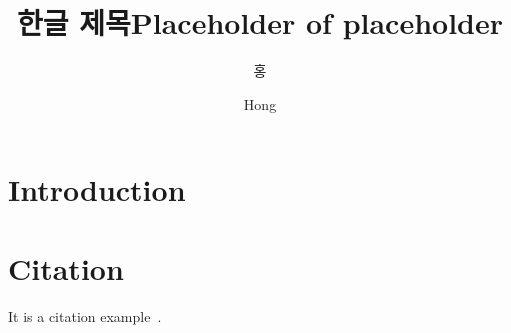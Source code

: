 \documentclass[doctor,english,final]{postech-ucs}
\title[korean]{한글 제목}
\title[english]{Placeholder of placeholder}
\author[korean]{홍}{길 동}
\author[english]{Hong}{Gil Dong}
\begin{document}

    \begin{abstract}
        \lipsum[1]
    \end{abstract}

    \tableofcontents


    \listoffigures



\chapter{Introduction}
\lipsum

\chapter{Citation}
It is a citation example~\cite{Moin1998}.

\begin{summarykorean}

\end{summarykorean}






\acknowledgement[korean]


\curriculumvitae[korean]
\end{document}
